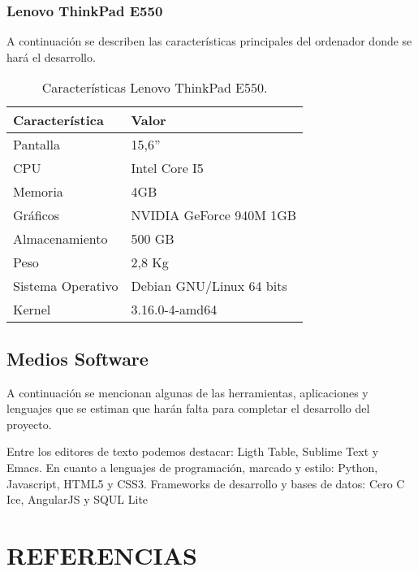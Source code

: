 \documentclass{pre-tfg}
\begin{document}
\subsubsection{Lenovo ThinkPad E550}

A  continuación  se  describen  las  características  principales  del
ordenador donde se hará el desarrollo.

\begin{table}[h!]
  \centering
  \caption{Características Lenovo ThinkPad E550. \cite{Lenovo}}
  \label{tab:Lenovo}
  \begin{tabular}{p{}p{}}
    \hline
    \textbf{Característica} & \textbf{Valor} \\
    \hline
    Pantalla & 15,6''\\
    CPU & Intel Core I5  \\
    Memoria & 4GB \\
    Gráficos & NVIDIA GeForce 940M 1GB \\
    Almacenamiento & 500 GB \\
    Peso & 2,8 Kg\\
    Sistema Operativo & Debian GNU/Linux 64 bits\\
    Kernel &  3.16.0-4-amd64\\
    \hline
  \end{tabular}
\end{table}

\subsection{Medios Software}
A continuación se mencionan  algunas de las herramientas, aplicaciones
y  lenguajes  que  se  estiman  que  harán  falta  para  completar  el
desarrollo del proyecto.

Entre los editores de texto podemos destacar: Ligth Table, Sublime Text y Emacs. En cuanto a lenguajes de programación, marcado y estilo: Python, Javascript, HTML5 y CSS3. Frameworks de desarrollo y bases de datos: Cero C Ice, AngularJS y SQUL Lite

\singlespace
\section{REFERENCIAS}

\end{document}
